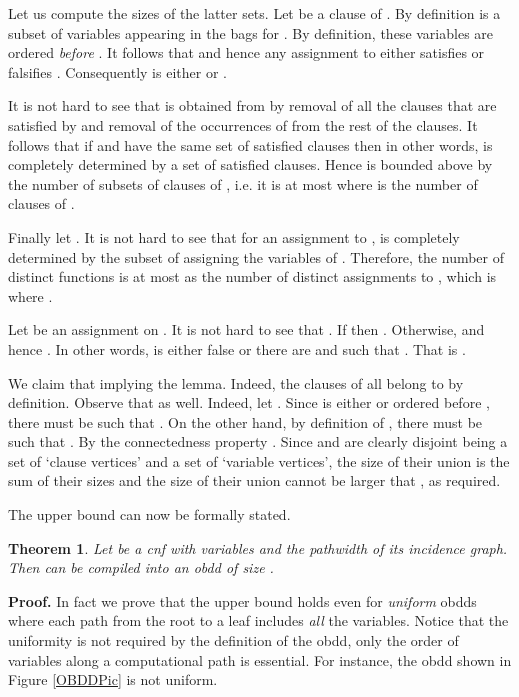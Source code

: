 \documentclass{article}
\newtheorem{theorem}{Theorem}
\begin{document}
Let us compute the sizes of the latter  sets. Let  be a clause of . 
By definition  is a subset of variables appearing in the bags 
for . By definition, these variables are ordered \emph{before} . It follows
that  and hence any assignment to  either satisfies or
falsifies . Consequently  is either  or .

It is not hard to see that  is obtained from  by removal of all the clauses
that are satisfied by  and removal of the occurrences of  from the rest of the 
clauses. It follows that if  and  have the same set of satisfied 
clauses then  in other words,  is completely determined by
a set of satisfied clauses. Hence  is bounded above by the number of 
subsets of clauses of , i.e. it is at most  where  is the number of 
clauses of .

Finally let . It is not hard to see that for an assignment 
to ,  is completely determined by the subset of  assigning the variables
of . Therefore, the number of distinct functions  is at most
as the number of distinct assignments to , which is  where .

Let  be an assignment on . It is not hard to see that 
. If  then . Otherwise,
 and hence . In other words,  is either false
or there are  and  such that .
That is . 

We claim that  implying the lemma. Indeed, the clauses of  all belong to
 by definition. Observe that  as well.
Indeed, let . Since  is either  or ordered before ,
there must be  such that . On the other hand,
by definition of , there must be  such that .
By the connectedness property . Since  and  are clearly
disjoint being a set of `clause vertices' and a set of `variable vertices', 
the size of their union is the sum of their sizes and the size of their union cannot be larger
that , as required. 

The upper bound can now be formally stated. 

\begin{theorem}
Let  be a {\sc cnf} with  variables and the pathwidth  of its incidence graph. 
Then  can be compiled into an {\sc obdd} of size . 
\end{theorem}

{\bf Proof.}
In fact we prove that the  upper bound holds even for \emph{uniform} {\sc obdd}s
where each path from the root to a leaf includes \emph{all} the variables. 
Notice that the uniformity is not required by the definition of the {\sc obdd}, only
the order of variables along a computational path is essential. For instance, the {\sc obdd}
shown in Figure \ref{OBDDPic} is not uniform. 
\end{document}
